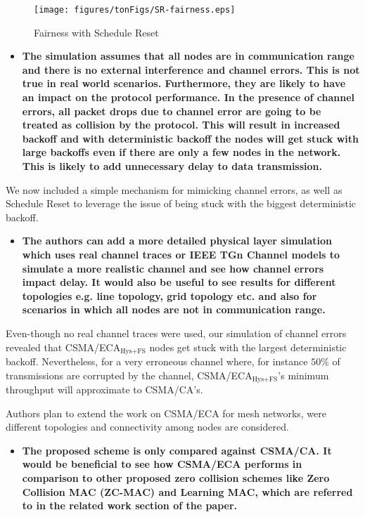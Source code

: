\documentclass[]{article}
\begin{document}
	\begin{figure}[tb]
	\centering
		\texttt{[image: figures/tonFigs/SR-fairness.eps]}
		\caption{Fairness with Schedule Reset}
		\label{fig:fairnessSR}
	\end{figure}
	
	\begin{itemize}
		\item {\bfseries The simulation assumes that all nodes are in communication range and there is no external interference and channel errors. This is not true in real world scenarios. Furthermore, they are likely to have an impact on the protocol performance. In the presence of channel errors, all packet drops due to channel error are going to be treated as collision by the protocol. This will result in increased backoff and with deterministic backoff the nodes will get stuck with large backoffs even if there are only a few nodes in the network. This is likely to add unnecessary delay to data transmission.}
	\end{itemize}
	
		We now included a simple mechanism for mimicking channel errors, as well as Schedule Reset to leverage the issue of being stuck with the biggest deterministic backoff.
		
	\begin{itemize}
		\item {\bfseries The authors can add a more detailed physical layer simulation which uses real channel traces or IEEE TGn Channel models to simulate a more realistic channel and see how channel errors impact delay. It would also be useful to see results for different topologies e.g. line topology, grid topology etc. and also for scenarios in which all nodes are not in communication range.}
	\end{itemize}

		Even-though no real channel traces were used, our simulation of channel errors revealed that CSMA/ECA$_{\text{Hys+FS}}$ nodes get stuck with the largest deterministic backoff. Nevertheless, for a very erroneous channel where, for instance $50\%$ of transmissions are corrupted by the channel, CSMA/ECA$_{\text{Hys+FS}}$'s minimum throughput will approximate to CSMA/CA's.
		
		Authors plan to extend the work on CSMA/ECA for mesh networks, were different topologies and connectivity among nodes are considered.
		
	\begin{itemize}
		\item {\bfseries The proposed scheme is only compared against CSMA/CA. It would be beneficial to see how CSMA/ECA performs in comparison to other proposed zero collision schemes like Zero Collision MAC (ZC-MAC) and Learning MAC, which are referred to in the related work section of the paper.}
	\end{itemize}
		
\end{document}
